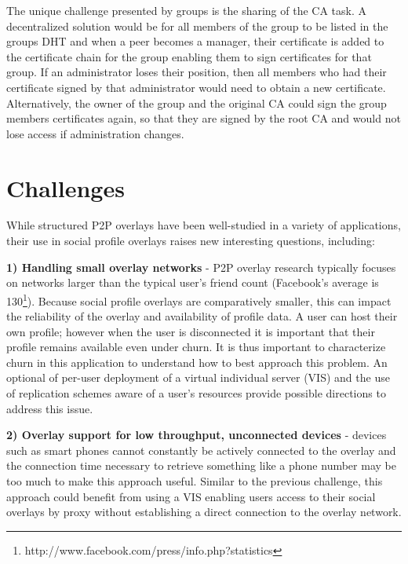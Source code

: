 \documentclass[conference]{IEEEtran}
\begin{document}
The unique challenge presented by groups is the sharing of the CA task.  A
decentralized solution would be for all members of the group to be listed in
the groups DHT and when a peer becomes a manager, their certificate is added
to the certificate chain for the group enabling them to sign certificates for
that group.  If an administrator loses their position, then all members who
had their certificate signed by that administrator would need to obtain a new
certificate.  Alternatively, the owner of the group and the original CA could
sign the group members certificates again, so that they are signed by the root
CA and would not lose access if administration changes.

\section{Challenges}
\label{outstanding}

While structured P2P overlays have been well-studied in a variety of
applications, their use in social profile overlays raises new interesting
questions, including:

{\bf 1) Handling small overlay networks} - P2P overlay research typically
focuses on networks larger than the typical user's friend count (Facebook's
average is 130\footnote{http://www.facebook.com/press/info.php?statistics}).
Because social profile overlays are comparatively smaller, this can impact the
reliability of the overlay and availability of profile data.  A user can host
their own profile; however when the user is disconnected it is important that
their profile remains available even under churn. It is thus important to
characterize churn in this application to understand how to best approach this
problem. An optional of per-user deployment of a virtual individual server
(VIS) and the use of replication schemes aware of a user's resources provide
possible directions to address this issue.

{\bf 2) Overlay support for low throughput, unconnected devices} - devices such
as smart phones cannot constantly be actively connected to the overlay and the
connection time necessary to retrieve something like a phone number may be too
much to make this approach useful.  Similar to the previous challenge, this
approach could benefit from using a VIS enabling users access to their social
overlays by proxy without establishing a direct connection to the overlay
network.
\end{document}
